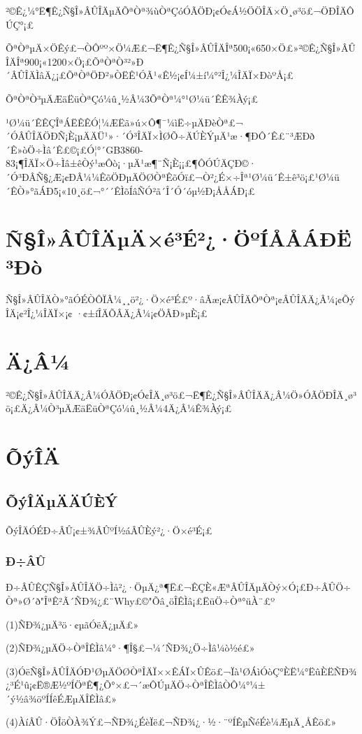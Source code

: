 ²©Ê¿¼°Ë¶Ê¿Ñ§Î»ÂÛÎÄµÄÕªÒª¾ùÒªÇóÓÃÖÐ¡¢Ó¢Á½ÖÖÎÄ×Ö¸ø³ö£¬ÖÐÎÄÔÚÇ°¡£

ÕªÒªµÄ×ÖÊý£¬ÒÔºº×Ö¼Æ£¬Ë¶Ê¿Ñ§Î»ÂÛÎÄÎª500¡«650×Ö£»²©Ê¿Ñ§Î»ÂÛÎÄÎª900¡«1200×Ö¡£ÕªÒªÒ³²»Ð´ÂÛÎÄÌâÄ¿¡£ÕªÒªÖÐ²»ÒËÊ¹ÓÃ¹«Ê½¡¢Í¼±í¼°²Î¿¼ÎÄÏ×ÐòºÅ¡£

ÕªÒªÒ³µÄÆäËüÒªÇó¼û¸½Â¼3ÕªÒª¼°¹Ø¼ü´ÊÊ¾Àý¡£

¹Ø¼ü´ÊÊÇÎªÁËÊÊÓ¦¼ÆËã»ú×Ô¶¯¼ìË÷µÄÐèÒª£¬´ÓÂÛÎÄÖÐÑ¡È¡µÄÄÜ¹»·´Ó³ÎÄÏ×ÌØÕ÷ÄÚÈÝµÄ¹æ·¶ÐÔ´Ê£¨³ÆÐð´Ê»òÖ÷Ìâ´Ê£©¡£Ó¦°´GB3860-83¡¶ÎÄÏ×Ö÷Ìâ±êÒý¹æÔò¡·µÄ¹æ¶¨Ñ¡È¡¡£¶ÔÓÚÄÇÐ©·´Ó³ÐÂÑ§¿Æ¡¢ÐÂ¼¼ÊõÖÐµÄÖØÒªÊõÓï£¬Ò²¿É×÷Îª¹Ø¼ü´Ê±ê³ö¡£¹Ø¼ü´ÊÒ»°ãÁÐ5¡«10¸ö£¬°´´ÊÌõÍâÑÓ²ã´Î´Ó´óµ½Ð¡ÅÅÁÐ¡£

\section{Ñ§Î»ÂÛÎÄµÄ×é³É²¿·ÖºÍÅÅÁÐË³Ðò}

Ñ§Î»ÂÛÎÄÒ»°ãÓÉÒÔÏÂ¼¸¸ö²¿·Ö×é³É£º·âÃæ¡¢ÂÛÎÄÕªÒª¡¢ÂÛÎÄÄ¿Â¼¡¢ÕýÎÄ¡¢²Î¿¼ÎÄÏ×¡¢
·¢±íÎÄÕÂÄ¿Â¼¡¢ÖÂÐ»µÈ¡£

\section{Ä¿Â¼}

²©Ê¿Ñ§Î»ÂÛÎÄÄ¿Â¼ÓÃÖÐ¡¢Ó¢ÎÄ¸ø³ö£¬Ë¶Ê¿Ñ§Î»ÂÛÎÄÄ¿Â¼Ö»ÓÃÖÐÎÄ¸ø³ö¡£Ä¿Â¼Ò³µÄÆäËüÒªÇó¼û¸½Â¼4Ä¿Â¼Ê¾Àý¡£

\section{ÕýÎÄ}

\subsection{ÕýÎÄµÄÄÚÈÝ}

ÕýÎÄÓÉÐ÷ÂÛ¡¢±¾ÂÛºÍ½áÂÛÈý²¿·Ö×é³É¡£

\subsubsection{Ð÷ÂÛ}

Ð÷ÂÛÊÇÑ§Î»ÂÛÎÄÖ÷Ìå²¿·ÖµÄ¿ª¶Ë£¬ÊÇÈ«ÆªÂÛÎÄµÄÒý×Ó¡£Ð÷ÂÛÖ÷Òª»Ø´ð"ÎªÊ²Ã´ÑÐ¾¿£¨Why£©"Õâ¸öÎÊÌâ¡£ËüÖ÷Òª°üÀ¨£º

(1)ÑÐ¾¿µÄ³ö·¢µãÓëÄ¿µÄ£»

(2)ÑÐ¾¿µÄÖ÷ÒªÎÊÌâ¼°·¶Î§£¬¼´ÑÐ¾¿Ö÷Ìâ¼ò½é£»

(3)ÓëÑ§Î»ÂÛÎÄÓÐ¹ØµÄÖØÒªÎÄÏ××ÊÁÏ×ÛÊö£¬Ïà¹ØÁìÓòÇ°ÈË¼°ËûÈËÑÐ¾¿³É¹û¡¢Ë®Æ½ºÍÖªÊ¶¿Õ°×£¬´æÔÚµÄÖ÷ÒªÎÊÌâÒÔ¼°¼±´ý½â¾öºÍÍêÉÆµÄÎÊÌâ£»

(4)ÀíÂÛ·ÖÎöÒÀ¾Ý£¬ÑÐ¾¿ÉèÏë£¬ÑÐ¾¿·½·¨ºÍÊµÑéÉè¼ÆµÄ¸ÅÊö£»

